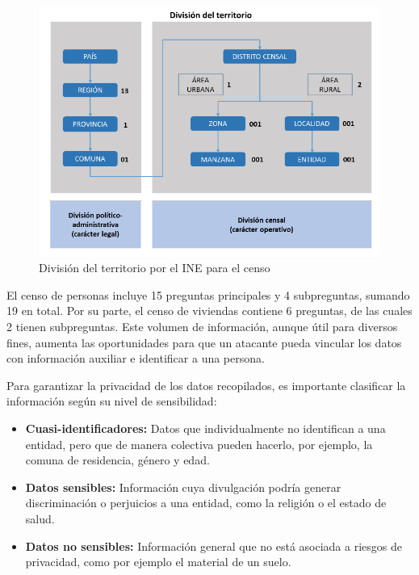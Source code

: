 \documentclass[informe]{upropuesta}
\begin{document}
\begin{figure}[H]
    \centering
    \includegraphics[width=\textwidth]{imagenes/investigacion/division_censal.pdf}
    \caption{División del territorio por el INE para el censo~\cite{INE2017}}
    \label{fig:division_geografica_chile}
\end{figure}

El censo de personas incluye 15 preguntas principales y 4 subpreguntas, sumando 19 en total. Por su parte, el censo de viviendas contiene 6 preguntas, de las cuales 2 tienen subpreguntas. Este volumen de información, aunque útil para diversos fines, aumenta las oportunidades para que un atacante pueda vincular los datos con información auxiliar e identificar a una persona.

Para garantizar la privacidad de los datos recopilados, es importante clasificar la información según su nivel de sensibilidad:

\begin{itemize}
    \item \textbf{Cuasi-identificadores:} Datos que individualmente no identifican a una entidad, pero que de manera colectiva pueden hacerlo, por ejemplo, la comuna de residencia, género y edad.
    \item \textbf{Datos sensibles:} Información cuya divulgación podría generar discriminación o perjuicios a una entidad, como la religión o el estado de salud.
    \item \textbf{Datos no sensibles:} Información general que no está asociada a riesgos de privacidad, como por ejemplo el material de un suelo.
\end{itemize}
\end{document}
